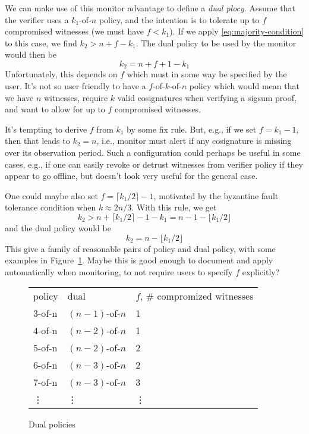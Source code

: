 \documentclass[a4paper]{article}
\newcommand{\floor}[1]{\lfloor #1 \rfloor}
\newcommand{\ceil}[1]{\lceil #1 \rceil}
\begin{document}
We can make use of this monitor advantage to define a \emph{dual
  plocy}. Assume that the verifier uses a $k_1$-of-$n$ policy, and the
intention is to tolerate up to $f$ compromised witnesses (we must have
$f < k_1$). If we apply \eqref{eq:majority-condition} to this case, we
find $k_2 > n + f - k_1$. The dual policy to be used by the monitor
would then be
\begin{equation}
  k_2 = n + f + 1 - k_1
\end{equation}
Unfortunately, this depends on $f$ which must in some way be specified
by the user. It's not so user friendly to have a $f$-of-$k$-of-$n$
policy which would mean that we have $n$ witnesses, require $k$ valid
cosignatures when verifying a sigsum proof, and want to allow for up
to $f$ compromised witnesses.

It's tempting to derive $f$ from $k_1$ by some fix rule. But, e.g., if
we set $f = k_1 - 1$, then that leads to $k_2 = n$, i.e., monitor must
alert if any cosignature is missing over its observation period. Such
a configuration could perhaps be useful in some cases, e.g., if one
can easily revoke or detrust witnesses from verifier policy if they
appear to go offline, but doesn't look very useful for the general
case.

One could maybe also set $f = \ceil{k_1/2} - 1$, motivated by the
byzantine fault tolerance condition when $k \approx 2n/3$. With this
rule, we get
\begin{equation}
  k_2 > n + \ceil{k_1/2} - 1 - k_1 = n - 1 - \floor{k_1/2}
\end{equation}
and the dual policy would be
\begin{equation}
  k_2 = n - \floor{k_1/2}
\end{equation}
This give a family of reasonable pairs of policy and dual policy, with
some examples in Figure~\ref{fig:dual-policies}. Maybe this is good
enough to document and apply automatically when monitoring, to not
require users to specify $f$ explicitly?

\begin{figure}[t]
  \centering
  \begin{tabular}{lll}
    policy & dual & $f$, \# compromized witnesses \\
    $3$-of-n & $(n-1)$-of-$n$ & 1 \\
    $4$-of-n & $(n-2)$-of-$n$ & 1 \\
    $5$-of-n & $(n-2)$-of-$n$ & 2 \\
    $6$-of-n & $(n-3)$-of-$n$ & 2 \\
    $7$-of-n & $(n-3)$-of-$n$ & 3 \\
    \vdots & \vdots & \vdots
  \end{tabular}
  \caption{Dual policies}
  \label{fig:dual-policies}
\end{figure}
\end{document}
